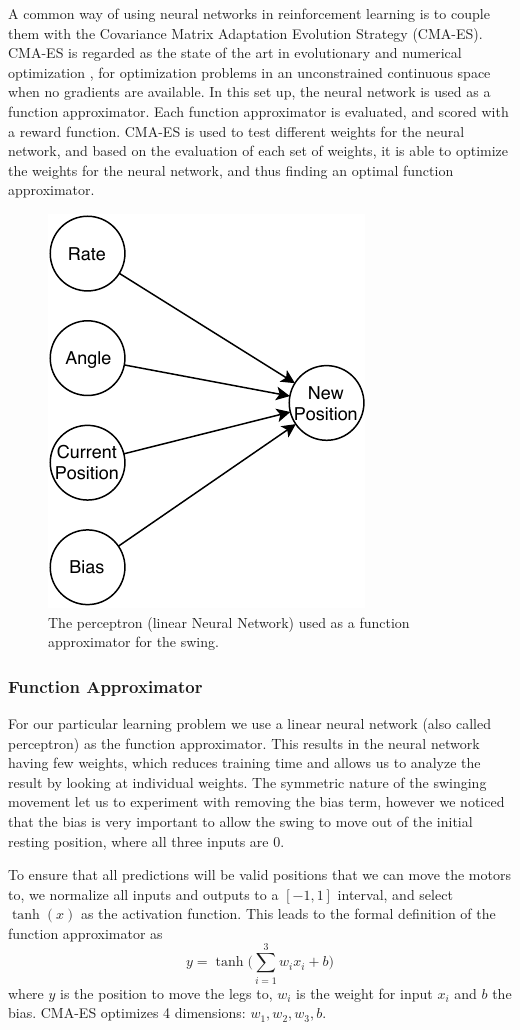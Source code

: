 \documentclass[11pt, a4paper]{article}
\begin{document}
	A common way of using neural networks in reinforcement learning is to couple them with the Covariance Matrix Adaptation Evolution Strategy (CMA-ES). CMA-ES is regarded as the state of the art in evolutionary and numerical optimization \cite{beyer}\cite{eiben_smith_2015}, for optimization problems in an unconstrained continuous space when no gradients are available. In this set up, the neural network is used as a function approximator. Each function approximator is evaluated, and scored with a reward function. CMA-ES is used to test different weights for the neural network, and based on the evaluation of each set of weights, it is able to optimize the weights for the neural network, and thus finding an optimal function approximator.
	
	\begin{figure}[h]
		\centering
		\includegraphics[width=0.3\linewidth]{images/swing_NN.pdf}
		\caption{The perceptron (linear Neural Network) used as a function approximator for the swing.}
		\label{fig:swing_NN}
	\end{figure}
	
	\subsubsection*{Function Approximator}
	For our particular learning problem we use a linear neural network (also called perceptron) as the function approximator. This results in the neural network having few weights, which reduces training time and allows us to analyze the result by looking at individual weights. The symmetric nature of the swinging movement let us to experiment with removing the bias term, however we noticed that the bias is very important to allow the swing to move out of the initial resting position, where all three inputs are $0$. 
	
	To ensure that all predictions will be valid positions that we can move the motors to, we normalize all inputs and outputs to a $[-1, 1]$ interval, and select $\tanh(x)$ as the activation function. This leads to the formal definition of the function approximator as
	$$
	y = \tanh{ \bigg( \sum_{i=1}^3 w_i x_i + b \bigg) }
	$$
	where $y$ is the position to move the legs to, $w_i$ is the weight for input $x_i$ and $b$ the bias. CMA-ES optimizes 4 dimensions: $w_1, w_2, w_3, b$.
	
\end{document}

